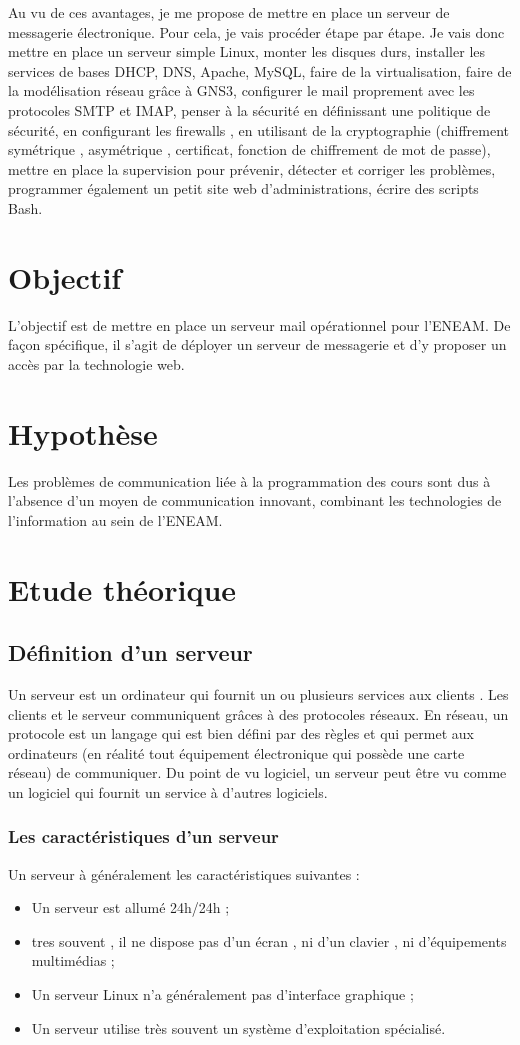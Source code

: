 \documentclass[a4paper,12pt,french]{report} %
\begin{document}
	Au vu de ces avantages, je me propose de mettre en place un serveur de messagerie électronique.
Pour cela, je vais procéder étape par étape. Je vais donc mettre en place un serveur simple Linux, monter les disques durs, installer les services de bases DHCP, DNS, Apache,  MySQL, faire de la virtualisation, faire de la modélisation réseau grâce à GNS3, configurer le mail proprement avec les protocoles SMTP et IMAP, penser à la sécurité en définissant une politique de sécurité, en configurant les firewalls , en utilisant de la cryptographie (chiffrement symétrique , asymétrique , certificat, fonction de chiffrement de mot de passe),  mettre en place la supervision pour prévenir, détecter et corriger les problèmes, programmer également un petit site web d'administrations, écrire des scripts Bash.  
	\section{Objectif}
	L'objectif est de mettre en place un serveur mail opérationnel pour l'ENEAM. De façon spécifique, il s'agit de déployer un serveur de messagerie et d'y proposer un accès par la technologie web.
	\section{Hypothèse}
	Les problèmes de communication liée à la programmation des cours sont dus à l'absence d'un moyen de communication innovant, combinant les technologies de l'information au sein de l'ENEAM.
	\section{Etude théorique}
		\subsection{Définition d'un serveur}
		Un serveur est un ordinateur qui fournit un ou plusieurs services aux clients . Les clients et le serveur communiquent grâces à des protocoles réseaux. En réseau, un protocole est un langage qui est bien défini par des règles et qui permet aux ordinateurs (en réalité tout équipement électronique qui possède une carte réseau) de communiquer. Du point de vu logiciel, un serveur peut être vu comme un logiciel qui fournit un service à d'autres logiciels.

\subsubsection{Les caractéristiques d'un serveur}
Un serveur à généralement les caractéristiques suivantes :
\begin{itemize}
\item Un serveur est allumé 24h/24h ;
\item tres souvent , il ne dispose pas d'un écran , ni d'un clavier , ni d'équipements multimédias ;
\item Un serveur Linux n'a généralement pas d'interface graphique ;
\item Un serveur utilise très souvent un système d'exploitation spécialisé.
\end{itemize}
\end{document}
